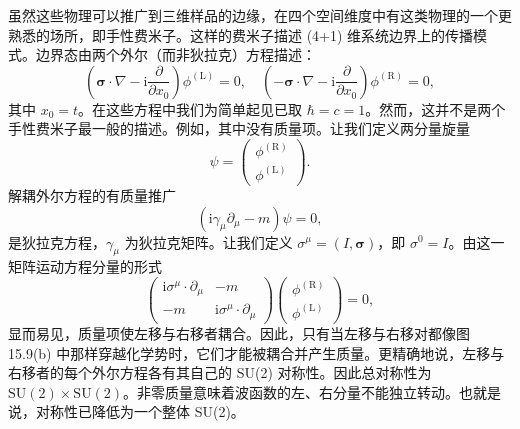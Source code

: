 虽然这些物理可以推广到三维样品的边缘，在四个空间维度中有这类物理的一个更熟悉的场所，即手性费米子。这样的费米子描述 (4+1) 维系统边界上的传播模式。边界态由两个外尔（而非狄拉克）方程描述：
\begin{equation*}
\left(\boldsymbol{\sigma}\cdot\nabla-\mathrm{i}\frac{\partial}{\partial x_{0}}\right)\phi^{(\mathrm{L})}=0,\quad\left(-\boldsymbol{\sigma}\cdot\nabla-\mathrm{i}\frac{\partial}{\partial x_{0}}\right)\phi^{(\mathrm{R})}=0,\tag{15.40}
\end{equation*}
其中 $x_{0}=t$。在这些方程中我们为简单起见已取 $\hbar=c=1$。然而，这并不是两个手性费米子最一般的描述。例如，其中没有质量项。让我们定义两分量旋量
\begin{equation*}
\psi=\begin{pmatrix}\phi^{(\mathrm{R})}\\ \phi^{(\mathrm{L})}\end{pmatrix}.\tag{15.41}
\end{equation*}
解耦外尔方程的有质量推广
\begin{equation*}
\left(\mathrm{i}\gamma_{\mu}\partial_{\mu}-m\right)\psi=0,\tag{15.42}
\end{equation*}
是狄拉克方程，$\gamma_{\mu}$ 为狄拉克矩阵。让我们定义 $\sigma^{\mu}=(I,\boldsymbol{\sigma})$，即 $\sigma^{0}=I$。由这一矩阵运动方程分量的形式
\begin{equation*}
\begin{pmatrix}\mathrm{i}\sigma^{\mu}\cdot\partial_{\mu} & -m\\ -m & \mathrm{i}\sigma^{\mu}\cdot\partial_{\mu}\end{pmatrix}\begin{pmatrix}\phi^{(\mathrm{R})}\\ \phi^{(\mathrm{L})}\end{pmatrix}=0,\tag{15.43}
\end{equation*}
显而易见，质量项使左移与右移者耦合。因此，只有当左移与右移对都像图 15.9(b) 中那样穿越化学势时，它们才能被耦合并产生质量。更精确地说，左移与右移者的每个外尔方程各有其自己的 SU(2) 对称性。因此总对称性为 $\mathrm{SU}(2)\times\mathrm{SU}(2)$。非零质量意味着波函数的左、右分量不能独立转动。也就是说，对称性已降低为一个整体 SU(2)。


